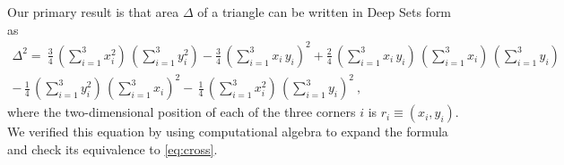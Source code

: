 \documentclass[12pt]{article}
\newcommand{\pseudosection}[1]
{\noindent{\color{green!66!black} (\textit{#1})}\par}
\begin{document}



\pseudosection{Result}

Our primary result is that area $\Delta$ of a triangle can be written in Deep Sets form as
\begin{multline} \label{eq:result}
    \Delta^2 = \
    \frac{3}{4} \, (\sum_{i=1}^{3} x_i^2 ) \, (\sum_{i=1}^{3} y_i^2 )
    - \frac{3}{4} \, (\sum_{i=1}^{3} x_i \, y_i )^2 
    + \frac{2}{4} \, (\sum_{i=1}^{3} x_i \, y_i ) \, (\sum_{i=1}^{3} x_i ) \, (\sum_{i=1}^{3} y_i )
    \\
    - \, \frac{1}{4} \, (\sum_{i=1}^{3} y_i^2 ) \, (\sum_{i=1}^{3} x_i )^2
    - \, \frac{1}{4} \, (\sum_{i=1}^{3} x_i^2 ) \, (\sum_{i=1}^{3} y_i )^2
     ~,
\end{multline}
where the two-dimensional position of each of the three corners $i$ is $r_i \equiv (x_i, y_i)$.
We verified this equation by using computational algebra to expand the formula and check its equivalence to \eqref{eq:cross}.
\end{document}
